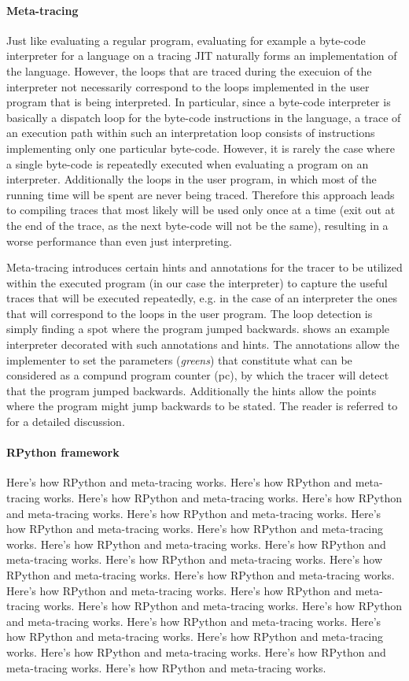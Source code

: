 \paragraph{Meta-tracing}
Just like evaluating a regular program, evaluating for example a
byte-code interpreter for a language on a tracing JIT naturally forms
an implementation of the language. However, the loops that are traced
during the execuion of the interpreter not necessarily correspond to
the loops implemented in the user program that is being
interpreted. In particular, since a byte-code interpreter is basically
a dispatch loop for the byte-code instructions in the language, a
trace of an execution path within such an interpretation loop consists
of instructions implementing only one particular byte-code. However,
it is rarely the case where a single byte-code is repeatedly executed
when evaluating a program on an interpreter. Additionally the loops in
the user program, in which most of the running time will be spent are
never being traced. Therefore this approach leads to compiling traces
that most likely will be used only once at a time (exit out at the end
of the trace, as the next byte-code will not be the same),
resulting in a worse performance than even just interpreting.

Meta-tracing introduces certain hints and annotations for the tracer
to be utilized within the executed program (in our case the
interpreter) to capture the useful traces that will be executed
repeatedly, e.g. in the case of an interpreter the ones that will
correspond to the loops in the user program. The loop detection is
simply finding a spot where the program jumped
backwards.  shows an example interpreter
decorated with such annotations and hints. The annotations allow the
implementer to set the parameters (\emph{greens}) that constitute what
can be considered as a compund program counter (pc), by which the
tracer will detect that the program jumped backwards. Additionally the
hints allow the points where the program might jump backwards to be
stated.  The reader is referred to \cite{bolz09} for a detailed
discussion.

\paragraph{RPython framework} Here's how RPython and meta-tracing works. Here's how RPython and meta-tracing works. Here's how RPython and meta-tracing works. Here's how RPython and meta-tracing works. Here's how RPython and meta-tracing works. Here's how RPython and meta-tracing works. Here's how RPython and meta-tracing works. Here's how RPython and meta-tracing works. Here's how RPython and meta-tracing works. Here's how RPython and meta-tracing works. Here's how RPython and meta-tracing works. Here's how RPython and meta-tracing works. Here's how RPython and meta-tracing works. Here's how RPython and meta-tracing works. Here's how RPython and meta-tracing works. Here's how RPython and meta-tracing works. Here's how RPython and meta-tracing works. Here's how RPython and meta-tracing works. Here's how RPython and meta-tracing works. Here's how RPython and meta-tracing works. Here's how RPython and meta-tracing works. Here's how RPython and meta-tracing works.

